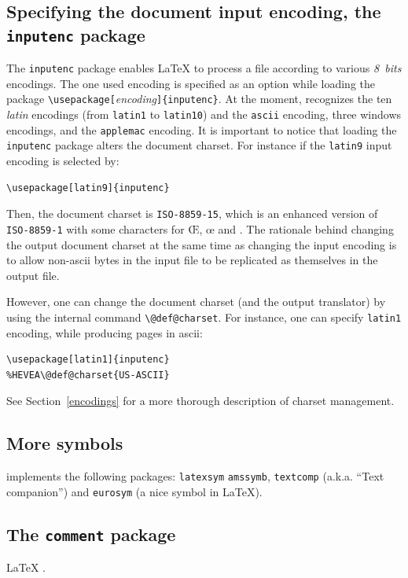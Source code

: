 \subsection{Specifying \label{inputenc}the document input encoding, the \texttt{inputenc} package}
The \texttt{inputenc} package enables \LaTeX{} to process a file
according to various \emph{8~bits} encodings.
The one used encoding is specified as an option while loading the package
\verb+\usepackage[+\textit{encoding}\verb+]{inputenc}+.
At the moment, \hevea{} recognizes the ten \emph{latin} encodings
(from \texttt{latin1} to \texttt{latin10}) and the \texttt{ascii}
encoding,
three windows encodings, and the \texttt{applemac} encoding.
It is important to notice that loading the \verb+inputenc+ package
alters the \html{} document charset.
For instance if the \texttt{latin9} input encoding is selected by:
\begin{verbatim}
\usepackage[latin9]{inputenc}
\end{verbatim}
Then, the document charset is \verb+ISO-8859-15+, which is an
enhanced version of \verb+ISO-8859-1+ with some characters
for \OE, \oe{} and \texteuro.
The rationale behind changing the output document charset at the same
time as changing the input encoding is to allow
non-ascii bytes in the input file to be replicated as
themselves in the output file.

However, one can change the document charset (and the output
translator) by using the internal command \verb+\@def@charset+.
For instance, one can specify \texttt{latin1} encoding, while
producing \html{} pages in ascii:
\begin{verbatim}
\usepackage[latin1]{inputenc}
%HEVEA\@def@charset{US-ASCII}
\end{verbatim}
See Section~\ref{encodings} for a more thorough description of \html{}
charset management.

\subsection{More symbols}
\hevea{} implements the following packages: \texttt{latexsym}
\texttt{amssymb}, \texttt{textcomp} (a.k.a. ``Text companion'')
and \texttt{eurosym} (a nice \texteuro{} symbol in \LaTeX).


\subsection{The \texttt{comment} package}
\LaTeX{} .

